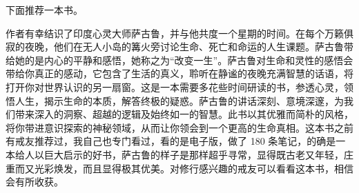 下面推荐一本书。

\begin{book}[《心灵午夜密谈》]
    作者有幸结识了印度心灵大师萨古鲁，并与他共度一个星期的时间。在每个万籁俱寂的夜晚，他们在无人小岛的篝火旁讨论生命、死亡和命运的人生课题。萨古鲁带给她的是内心的平静和感悟，她称之为“改变一生”。萨古鲁对生命和灵性的感悟会带给你真正的感动，它包含了生活的真义，聆听在静谧的夜晚充满智慧的话语，将打开你对世界认识的另一扇窗。这是一本需要多花些时间研读的书，参透心灵，领悟人生，揭示生命的本质，解答终极的疑惑。萨古鲁的讲话深刻、意境深邃，为我们带来深入的洞察、超越的逻辑及始终如一的智慧。此书以其优雅而简朴的风格，将你带进意识探索的神秘领域，从而让你领会到一个更高的生命真相。这本书之前有戒友推荐过，我自己也专门看过，看的是电子版，做了 180 条笔记，的确是一本给人以巨大启示的好书，萨古鲁的样子是那样超乎寻常，显得既古老又年轻，庄重而又光彩焕发，而且显得极其优美。对修行感兴趣的戒友可以看看这本书，相信会有所收获。
\end{book}
